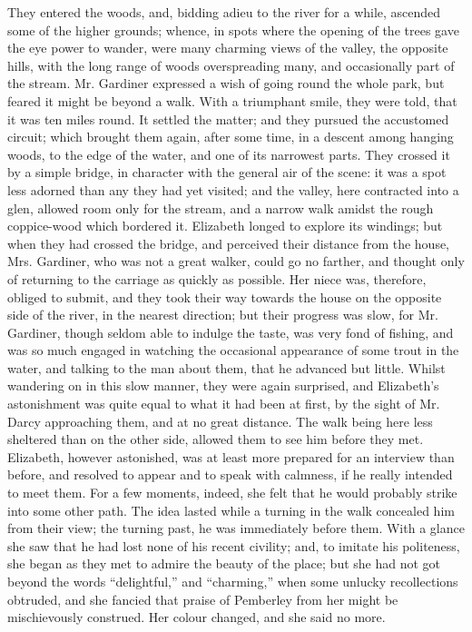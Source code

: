 They entered the woods, and, bidding adieu to the river for a while, ascended some of the higher grounds; whence, in spots where the opening of the trees gave the eye power to wander, were many charming views of the valley, the opposite hills, with the long range of woods overspreading many, and occasionally part of the stream. Mr. Gardiner expressed a wish of going round the whole park, but feared it might be beyond a walk. With a triumphant smile, they were told, that it was ten miles round. It settled the matter; and they pursued the accustomed circuit; which brought them again, after some time, in a descent among hanging woods, to the edge of the water, and one of its narrowest parts. They crossed it by a simple bridge, in character with the general air of the scene: it was a spot less adorned than any they had yet visited; and the valley, here contracted into a glen, allowed room only for the stream, and a narrow walk amidst the rough coppice-wood which bordered it. Elizabeth longed to explore its windings; but when they had crossed the bridge, and perceived their distance from the house, Mrs. Gardiner, who was not a great walker, could go no farther, and thought only of returning to the carriage as quickly as possible. Her niece was, therefore, obliged to submit, and they took their way towards the house on the opposite side of the river, in the nearest direction; but their progress was slow, for Mr. Gardiner, though seldom able to indulge the taste, was very fond of fishing, and was so much engaged in watching the occasional appearance of some trout in the water, and talking to the man about them, that he advanced but little. Whilst wandering on in this slow manner, they were again surprised, and Elizabeth's astonishment was quite equal to what it had been at first, by the sight of Mr. Darcy approaching them, and at no great distance. The walk being here less sheltered than on the other side, allowed them to see him before they met. Elizabeth, however astonished, was at least more prepared for an interview than before, and resolved to appear and to speak with calmness, if he really intended to meet them. For a few moments, indeed, she felt that he would probably strike into some other path. The idea lasted while a turning in the walk concealed him from their view; the turning past, he was immediately before them. With a glance she saw that he had lost none of his recent civility; and, to imitate his politeness, she began as they met to admire the beauty of the place; but she had not got beyond the words ``delightful,'' and ``charming,'' when some unlucky recollections obtruded, and she fancied that praise of Pemberley from her might be mischievously construed. Her colour changed, and she said no more.

